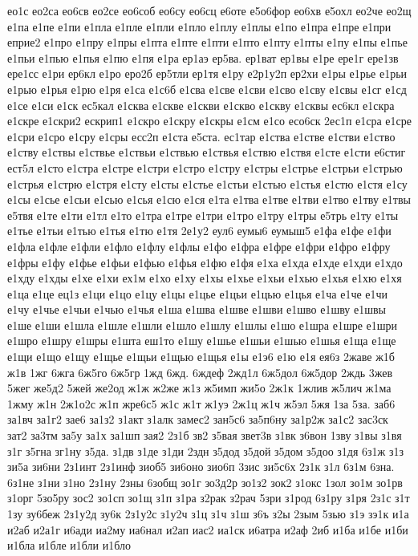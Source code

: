 {ео1с
ео2са
ео6св
ео2се
ео6соб
ео6су
ео6сц
е6оте
е5о6фор
ео6хв
е5охл
ео2че
ео2щ
е1па
е1пе
е1пи
е1пла
е1пле
е1пли
е1пло
е1плу
е1плы
е1по
е1пра
е1пре
е1при
еприе2
е1про
е1пру
е1пры
е1пта
е1пте
е1пти
е1пто
е1пту
е1пты
е1пу
е1пы
е1пье
е1пьи
е1пью
е1пья
е1пю
е1пя
е1ра
ер1аэ
ер5ва.
ер1ват
ер1вы
е1ре
ере1г
ере1зв
ере1сс
е1ри
ер6кл
е1ро
еро2б
ер5тли
ер1тя
е1ру
е2р1у2п
ер2хи
е1ры
е1рье
е1рьи
е1рью
е1рья
е1рю
е1ря
е1са
е1с6б
е1сва
е1све
е1сви
е1сво
е1сву
е1свы
е1сг
е1сд
е1се
е1си
е1ск
ес5кал
е1сква
е1скве
е1скви
е1скво
е1скву
е1сквы
ес6кл
е1скра
е1скре
е1скри2
ескрип1
е1скро
е1скру
е1скры
е1см
е1со
есо6ск
2ес1п
е1сра
е1сре
е1сри
е1сро
е1сру
е1сры
есс2п
е1ста
е5ста.
ес1тар
е1ства
е1стве
е1стви
е1ство
е1ству
е1ствы
е1ствье
е1ствьи
е1ствью
е1ствья
е1ствю
е1ствя
е1сте
е1сти
е6стиг
ест5л
е1сто
е1стра
е1стре
е1стри
е1стро
е1стру
е1стры
е1стрье
е1стрьи
е1стрью
е1стрья
е1стрю
е1стря
е1сту
е1сты
е1стье
е1стьи
е1стью
е1стья
е1стю
е1стя
е1су
е1сы
е1сье
е1сьи
е1сью
е1сья
е1сю
е1ся
е1та
е1тва
е1тве
е1тви
е1тво
е1тву
е1твы
е5твя
е1те
е1ти
е1тл
е1то
е1тра
е1тре
е1три
е1тро
е1тру
е1тры
е5трь
е1ту
е1ты
е1тье
е1тьи
е1тью
е1тья
е1тю
е1тя
2е1у2
еул6
еумы6
еумыш5
е1фа
е1фе
е1фи
е1фла
е1фле
е1фли
е1фло
е1флу
е1флы
е1фо
е1фра
е1фре
е1фри
е1фро
е1фру
е1фры
е1фу
е1фье
е1фьи
е1фью
е1фья
е1фю
е1фя
е1ха
е1хда
е1хде
е1хди
е1хдо
е1хду
е1хды
е1хе
е1хи
ех1м
е1хо
е1ху
е1хы
е1хье
е1хьи
е1хью
е1хья
е1хю
е1хя
е1ца
е1це
ец1з
е1ци
е1цо
е1цу
е1цы
е1цье
е1цьи
е1цью
е1цья
е1ча
е1че
е1чи
е1чу
е1чье
е1чьи
е1чью
е1чья
е1ша
е1шва
е1шве
е1шви
е1шво
е1шву
е1швы
е1ше
е1ши
е1шла
е1шле
е1шли
е1шло
е1шлу
е1шлы
е1шо
е1шра
е1шре
е1шри
е1шро
е1шру
е1шры
е1шта
еш1то
е1шу
е1шье
е1шьи
е1шью
е1шья
е1ща
е1ще
е1щи
е1що
е1щу
е1щье
е1щьи
е1щью
е1щья
е1ы
е1э6
е1ю
е1я
ея6з
2жаве
ж1б
ж1в
1жг
6жга
6ж5го
6ж5гр
1жд
6жд.
6ждеф
2жд1л
6ж5дол
6ж5дор
2ждь
3жев
5жег
же5д2
5жей
же2од
ж1ж
ж2же
ж1з
ж5имп
жи5о
2ж1к
1жлив
ж5лич
ж1ма
1жму
ж1н
2ж1о2с
ж1п
жре6с5
ж1с
ж1т
ж1уэ
2ж1ц
ж1ч
ж5эл
5жя
1за
5за.
заб6
за1вч
за1г2
зае6
за1з2
з1акт
з1алк
замес2
зан5с6
за5п6ну
за1р2ж
за1с2
зас3ск
зат2
за3тм
за5у
за1х
за1шп
зая2
2з1б
зв2
з5вая
звет3в
з1вк
з6вон
1зву
з1вы
з1вя
з1г
з5гна
зг1ну
з5да.
з1дв
з1де
з1ди
2здн
з5дод
з5дой
з5дом
з5доо
з1дя
6з1ж
з1з
зи5а
зи6ни
2з1инт
2з1инф
зиоб5
зи6оно
зио6п
3зис
зи5с6х
2з1к
з1л
6з1м
6зна.
6з1не
з1ни
з1но
2з1ну
2зны
6зобщ
зо1г
зо3д2р
зо1з2
зок2
з1окс
1зол
зо1м
зо1рв
з1орг
5зо5ру
зос2
зо1сп
зо1щ
з1п
з1ра
з2рак
з2рач
5зри
з1род
6з1ру
з1ря
2з1с
з1т
1зу
зу6беж
2з1у2д
зу6к
2з1у2с
з1у2ч
з1ц
з1ч
з1ш
з6ъ
з2ы
2зым
5зью
з1э
зэ1к
и1а
и2аб
и2а1г
и6ади
иа2му
иа6нал
и2ап
иас2
иа1ск
и6атра
и2аф
2иб
и1ба
и1бе
и1би
и1бла
и1бле
и1бли
и1бло
}
